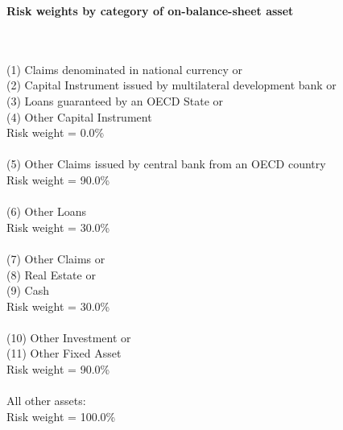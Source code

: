\documentclass{article}
\begin{document}
\setlength{\parindent}{0em}
\begin{center}{\bf Risk weights by category of on-balance-sheet asset}\end{center}
~\\
~\\

(1) Claims denominated in national currency or \\
(2) Capital Instrument issued by multilateral development bank or \\
(3) Loans guaranteed by an OECD State or \\
(4) Other Capital Instrument\\
Risk weight = 0.0\%\\

~\\
(5) Other Claims issued by central bank from an OECD country \\
Risk weight = 90.0\%\\

~\\
(6) Other Loans\\
Risk weight = 30.0\%\\

~\\
(7) Other Claims or \\
(8) Real Estate or \\
(9) Cash \\
Risk weight = 30.0\%\\

~\\
(10) Other Investment or \\
(11) Other Fixed Asset\\
Risk weight = 90.0\%\\

~\\
All other assets:\\
Risk weight = 100.0\%\\

~\\
\end{document}

